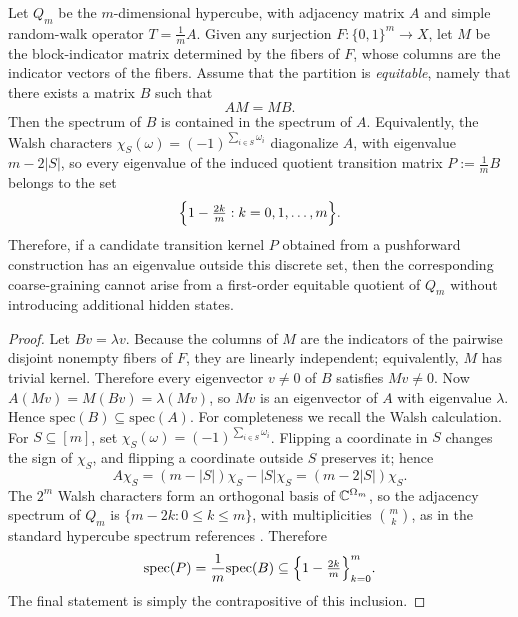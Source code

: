 \begin{theorem}\label{thm:window6-strong-lumpability-spectral-rigidity}
Let \(Q_m\) be the \(m\)-dimensional hypercube, with adjacency matrix \(A\) and simple random-walk operator \(T=\frac{1}{m}A\).
Given any surjection \(F:\{0,1\}^m\to X\), let \(M\) be the block-indicator matrix determined by the fibers of \(F\), whose columns are the indicator vectors of the fibers.
Assume that the partition is \emph{equitable}, namely that there exists a matrix \(B\) such that
\[
AM=MB.
\]
Then the spectrum of \(B\) is contained in the spectrum of \(A\).
Equivalently, the Walsh characters \(\chi_S(\omega)=(-1)^{\sum_{i\in S}\omega_i}\) diagonalize \(A\), with eigenvalue \(m-2|S|\), so every eigenvalue of the induced quotient transition matrix \(P:=\frac{1}{m}B\) belongs to the set
\[
\Bigl\{1-\tfrac{2k}{m}: k=0,1,\dots,m\Bigr\}.
\]
Therefore, if a candidate transition kernel \(P\) obtained from a pushforward construction has an eigenvalue outside this discrete set, then the corresponding coarse-graining cannot arise from a first-order equitable quotient of \(Q_m\) without introducing additional hidden states.
\end{theorem}

\begin{proof}
Let \(Bv=\lambda v\).
Because the columns of \(M\) are the indicators of the pairwise disjoint nonempty fibers of \(F\), they are linearly independent; equivalently, \(M\) has trivial kernel.
Therefore every eigenvector \(v\neq 0\) of \(B\) satisfies \(Mv\neq 0\).
Now
\(
A(Mv)=M(Bv)=\lambda(Mv)
\),
so \(Mv\) is an eigenvector of \(A\) with eigenvalue \(\lambda\).
Hence \(\mathrm{spec}(B)\subseteq \mathrm{spec}(A)\).
For completeness we recall the Walsh calculation.  For \(S\subseteq[m]\), set \(\chi_S(\omega)=(-1)^{\sum_{i\in S}\omega_i}\).  Flipping a coordinate in \(S\) changes the sign of \(\chi_S\), and flipping a coordinate outside \(S\) preserves it; hence
\[
A\chi_S=(m-|S|)\chi_S-|S|\chi_S=(m-2|S|)\chi_S.
\]
The \(2^m\) Walsh characters form an orthogonal basis of \(\mathbb{C}^{\Omega_m}\), so the adjacency spectrum of \(Q_m\) is \(\{m-2k:0\le k\le m\}\), with multiplicities \(\binom mk\), as in the standard hypercube spectrum references \cite{biggs1993algebraic,godsil2001algebraic,macwilliams1977theory}.  Therefore
\[
\mathrm{spec}(P)=\frac{1}{m}\mathrm{spec}(B)\subseteq \Bigl\{1-\tfrac{2k}{m}\Bigr\}_{k=0}^m.
\]
The final statement is simply the contrapositive of this inclusion. \qedhere
\end{proof}

